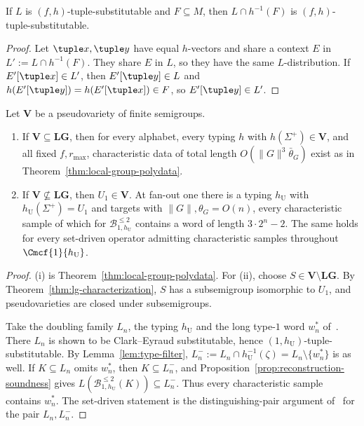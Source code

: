 \begin{lemma}
\label{lem:type-filter}
If $L$ is $(f,h)$-tuple-substitutable and $F\subseteq M$, then
$L\cap h^{-1}(F)$ is $(f,h)$-tuple-substitutable.
\end{lemma}

\begin{proof}
Let $\tuple x,\tuple y$ have equal $h$-vectors and share a context $E$
in $L':=L\cap h^{-1}(F)$.  They share $E$ in $L$, so they have the same
$L$-distribution.  If $E'[\tuple x]\in L'$, then $E'[\tuple y]\in L$
and $h(E'[\tuple y])=h(E'[\tuple x])\in F$, so $E'[\tuple y]\in L'$.
\end{proof}

\begin{corollary}
\label{cor:pseudovariety-dichotomy}
Let $\mathbf V$ be a pseudovariety of finite semigroups.
\begin{enumerate}[label=\textup{(\roman*)},leftmargin=*]
\item If $\mathbf V\subseteq\mathbf{LG}$, then for every alphabet,
every typing $h$ with $h(\Sigma^+)\in\mathbf V$, and all fixed
$f,r_{\max}$, characteristic data of total length
$O(\|G\|^3\bar\theta_G)$ exist as in
Theorem~\ref{thm:local-group-polydata}.
\item If $\mathbf V\not\subseteq\mathbf{LG}$, then
$U_1\in\mathbf V$.  At fan-out one there is a typing $h_{\mathrm U}$ with
$h_{\mathrm U}(\Sigma^+)=U_1$ and targets with $\|G\|,\theta_G=O(n)$,
every characteristic sample of which for
$\mathcal B^{\le2}_{1,h_{\mathrm U}}$ contains a word of length
$3\cdot2^n-2$.  The same holds for every set-driven operator admitting
characteristic samples throughout $\Cmcf{1}{h_{\mathrm U}}$.
\end{enumerate}
\end{corollary}

\begin{proof}
(i) is Theorem~\ref{thm:local-group-polydata}.  For (ii), choose
$S\in\mathbf V\setminus\mathbf{LG}$.  By
Theorem~\ref{thm:lg-characterization}, $S$ has a subsemigroup isomorphic
to $U_1$, and pseudovarieties are closed under subsemigroups.

Take the doubling family $L_n$, the typing $h_{\mathrm U}$ and the long
type-$1$ word $w_n^*$ of~\cite[Proposition~6.3]{kuriyamaCFG}.  There
$L_n$ is shown to be Clark--Eyraud substitutable, hence
$(1,h_{\mathrm U})$-tuple-substitutable.  By
Lemma~\ref{lem:type-filter},
$L_n^-:=L_n\cap h_{\mathrm U}^{-1}(\zeta)=L_n\setminus\{w_n^*\}$ is as
well.  If $K\subseteq L_n$ omits $w_n^*$, then $K\subseteq L_n^-$, and
Proposition~\ref{prop:reconstruction-soundness} gives
$L(\mathcal B^{\le2}_{1,h_{\mathrm U}}(K))\subseteq L_n^-$.  Thus every
characteristic sample contains $w_n^*$.  The set-driven statement is
the distinguishing-pair argument of~\cite[Proposition~6.3(iv)]{kuriyamaCFG} for the pair
$L_n,L_n^-$.
\end{proof}

